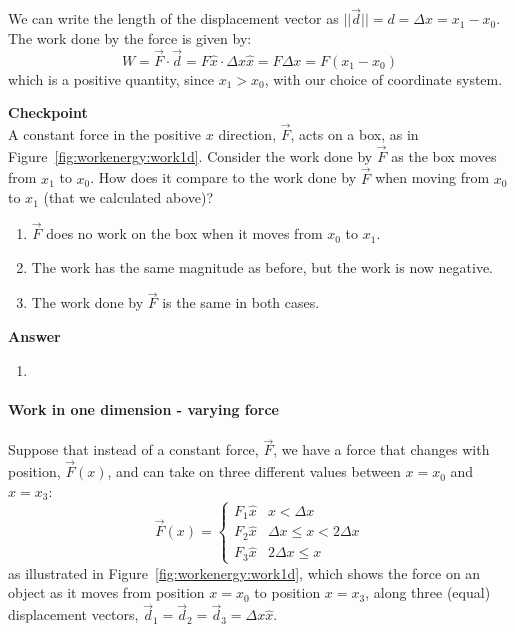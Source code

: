 We can write the length of the displacement vector as $||\vec d|| =d= \Delta x = x_1 -x_0$. The work done by the force is given by:
\begin{equation}
W = \vec F \cdot \vec d = F\hat x\cdot \Delta x\hat x =F\Delta x =F(x_1-x_0)
\end{equation}
which is a positive quantity, since $x_1 > x_0$, with our choice of coordinate system.

\begin{framed}
\textbf{Checkpoint}\\
A constant force in the positive $x$ direction, $\vec F$, acts on a box, as in Figure~\ref{fig:workenergy:work1d}. Consider the work done by $\vec F$ as the box moves from $x_1$ to $x_0$. How does it compare to the work done by $\vec F$ when moving from $x_0$ to $x_1$ (that we calculated above)?

\begin{enumerate}
\item $\vec F$ does no work on the box when it moves from $x_0$ to $x_1$.
\item The work has the same magnitude as before, but the work is now negative.
\item The work done by $\vec F$ is the same in both cases.
\end{enumerate}

\begin{framed}
\textbf{Answer}\\
\begin{enumerate}[resume]
\item
\end{enumerate}
\end{framed}
\end{framed}

\paragraph{Work in one dimension - varying force}

Suppose that instead of a constant force, $\vec F$, we have a force that changes with position, $\vec F(x)$, and can take on three different values between $x=x_0$ and $x=x_3$:
\begin{equation}
  \vec F (x)=
  \begin{cases}
    F_1\hat x & x<\Delta x \\
    F_2\hat x & \Delta x \leq x< 2\Delta x \\
    F_3\hat x & 2\Delta x \leq x
  \end{cases}
\end{equation}
as illustrated in Figure~\ref{fig:workenergy:work1d}, which shows the force on an object as it moves from position $x=x_0$ to position $x=x_3$, along three (equal) displacement vectors, $\vec d_1=\vec d_2=\vec d_3=\Delta x \hat x$.

